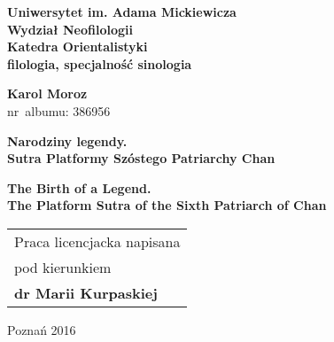 \begin{titlepage}%
  \begin{center}%
    {\large \textbf{Uniwersytet im. Adama Mickiewicza\\ Wydział Neofilologii\\ Katedra Orientalistyki\\ filologia, specjalność sinologia}\par}
    \par
  \end{center}%
   \vspace{1cm plus 1fill}
  \begin{flushleft}%
    {{\Large\bfseries Karol Moroz}\\
    nr~albumu: 386956\par}
  \end{flushleft}%
   \vspace{8mm plus 1mm minus 2mm}
  \begin{center}%
    {\huge\textbf{Narodziny legendy.\\Sutra Platformy Szóstego Patriarchy Chan}\par}
    \vspace{1em}
    {\Large\textbf{The Birth of a Legend.\\[3pt] The Platform Sutra of the Sixth Patriarch of Chan}}
    \vspace{2cm plus 1.5fill}
    \begin{flushright}\large
      \begin{tabular}{l}
        Praca licencjacka napisana\\[3pt]
        pod kierunkiem\\[3pt]
        \bfseries dr Marii Kurpaskiej
      \end{tabular}
    \end{flushright}
    \vspace{15mm plus .1fill}
    {\large Poznań 2016\par}
  \end{center}
\end{titlepage}%
